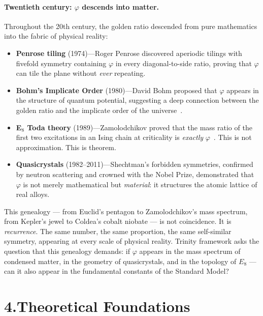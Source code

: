 \documentclass[10pt,a4paper]{article}
\begin{document}
\paragraph{Twentieth century: $\varphi$ descends into matter.}
Throughout the 20th century, the golden ratio descended from pure mathematics
into the fabric of physical reality:
\begin{itemize}
  \item \textbf{Penrose tiling} (1974)---Roger Penrose discovered aperiodic tilings
        with fivefold symmetry containing $\varphi$ in every diagonal-to-side ratio,
        proving that $\varphi$ can tile the plane without \emph{ever} repeating.
  \item \textbf{Bohm's Implicate Order} (1980)---David Bohm proposed that $\varphi$
        appears in the structure of quantum potential, suggesting a deep connection
        between the golden ratio and the implicate order of the universe~\cite{olsen2026}.
  \item \textbf{E$_8$ Toda theory} (1989)---Zamolodchikov proved that the mass ratio
        of the first two excitations in an Ising chain at criticality is \emph{exactly}
        $\varphi$~\cite{zamolodchikov1989}. This is not approximation. This is theorem.
  \item \textbf{Quasicrystals} (1982--2011)---Shechtman's forbidden symmetries,
        confirmed by neutron scattering and crowned with the Nobel Prize, demonstrated
        that $\varphi$ is not merely mathematical but \emph{material}: it structures
        the atomic lattice of real alloys.
\end{itemize}

This genealogy --- from Euclid's pentagon to Zamolodchikov's mass spectrum,
from Kepler's jewel to Coldea's cobalt niobate --- is not coincidence.
It is \emph{recurrence}. The same number, the same proportion, the same
self-similar symmetry, appearing at every scale of physical reality.
Trinity framework asks the question that this genealogy demands:
if $\varphi$ appears in the mass spectrum of condensed matter,
in the geometry of quasicrystals, and in the topology of $E_8$ ---
can it also appear in the fundamental constants of the Standard Model?

\section*{4.\quad Theoretical Foundations}
\end{document}
